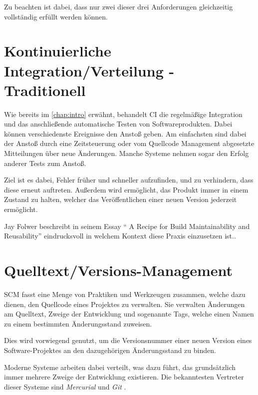 Zu beachten ist dabei, dass nur zwei dieser drei Anforderungen gleichzeitig
vollständig erfüllt werden können.

\section{Kontinuierliche Integration/Verteilung - Traditionell}
\label{sec:base:ci}

Wie bereits im \cref{chap:intro} erwähnt, behandelt \ac{CI} die regelmäßige Integration und das anschließende automatische Testen von Softwareprodukten.
Dabei können verschiedenste Ereignisse den Anstoß geben.
Am einfachsten sind dabei der Anstoß durch eine Zeitsteuerung
oder vom Quellcode Management abgesetzte Mitteilungen über neue Änderungen.
Manche Systeme nehmen sogar den Erfolg anderer Tests zum Anstoß.

Ziel ist es dabei, Fehler früher und schneller aufzufinden,
und zu verhindern, dass diese erneut auftreten.
Außerdem wird ermöglicht, das Produkt immer in einem Zustand zu halten,
welcher das Veröffentlichen einer neuen Version jederzeit ermöglicht.

Jay Folwer beschreibt in seinem Essay ``
A Recipe for Build Maintainability and Reusability'' \cite{folwer:receipe} eindrucksvoll in welchem Kontext diese Praxis einzusetzen ist..


\section{Quelltext/Versions-Management}
\label{sec:base:scm}


\ac{SCM} fasst eine Menge von Praktiken und Werkzeugen zusammen,
welche dazu dienen, den Quellcode eines Projektes zu verwalten.
Sie verwalten Änderungen am Quelltext, Zweige der Entwicklung und sogenannte Tags,
welche einen Namen zu einem bestimmten Änderungsstand zuweisen.

Dies wird vorwiegend genutzt, um die Versionsnummer einer neuen Version eines Software-Projektes an den dazugehörigen Änderungsstand zu binden.

Moderne Systeme arbeiten dabei verteilt,
was dazu führt, das grundsätzlich immer mehrere Zweige der Entwicklung existieren.
Die bekanntesten Vertreter dieser Systeme sind \emph{Mercurial} \cite{mercurial:website}
und \emph{Git} \cite{git:website}.

